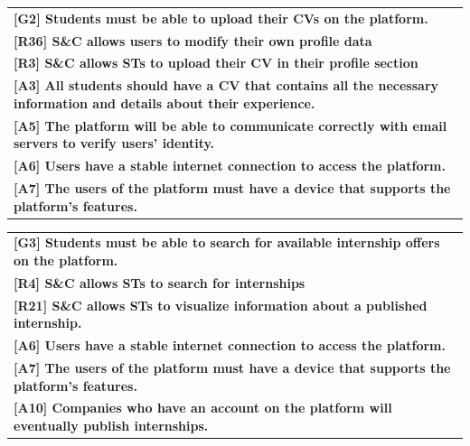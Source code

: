 \begin{center}
    \begin{tabular}{|p{37em}|}
        \rowcolor{bluepoli!40} %
        \hline
        \textbf{[G2] Students must be able to upload their CVs on the platform.} \\
        \rowcolor{bluepoli!15}
        \textbf{[R36] S\&C allows users to modify their own profile data} \\
        \rowcolor{bluepoli!15}
        \textbf{[R3] S\&C allows STs to upload their CV in their profile section} \\
        \textbf{[A3] All students should have a CV that contains all the necessary information and details about their experience.} \\
        \textbf{[A5] The platform will be able to communicate correctly with email servers to verify users’ identity.}\\
        \textbf{[A6] Users have a stable internet connection to access the platform.}\\
        \textbf{[A7] The users of the platform must have a device that supports the platform's features.}\\
        \hline
    \end{tabular}
\end{center}

\begin{center}
    \begin{tabular}{|p{37em}|}
        \rowcolor{bluepoli!40} %
        \hline
        \textbf{[G3] Students must be able to search for available internship offers on the platform.} \\
        \rowcolor{bluepoli!15}
        \textbf{[R4] S\&C allows STs to search for internships} \\
        \rowcolor{bluepoli!15}
        \textbf{[R21] S\&C allows STs to visualize information about a published internship.} \\
        \textbf{[A6] Users have a stable internet connection to access the platform.}\\
        \textbf{[A7] The users of the platform must have a device that supports the platform's features.}\\
        \textbf{[A10] Companies who have an account on the platform will eventually publish internships.}\\
        \hline
    \end{tabular}
\end{center}

